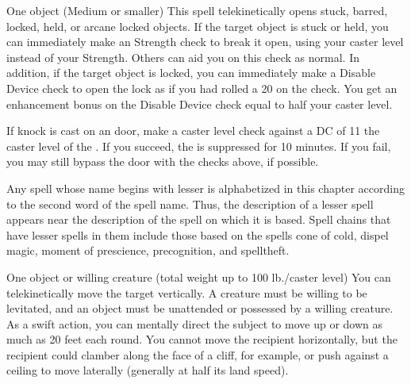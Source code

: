 \begin{comment}
\subsubsection{J-L}
\end{comment}

\spellrng{\rngclose}
\begin{spelltarget}{One object (Medium or smaller)}
    \spelleffect This spell telekinetically opens stuck, barred, locked, held, or arcane locked objects. If the target object is stuck or held, you can immediately make an Strength check to break it open, using your caster level instead of your Strength. Others can aid you on this check as normal. In addition, if the target object is locked, you can immediately make a Disable Device check to open the lock as if you had rolled a 20 on the check. You get an enhancement bonus on the Disable Device check equal to half your caster level.
\end{spelltarget}
\spellnotes If knock is cast on an  door, make a caster level check against a DC of 11 \add the caster level of the . If you succeed, the  is suppressed for 10 minutes. If you fail, you may still bypass the door with the checks above, if possible.

\par Any spell whose name begins with lesser is alphabetized in this chapter according to the second word of the spell name. Thus, the description of a lesser spell appears near the description of the spell on which it is based. Spell chains that have lesser spells in them include those based on the spells cone of cold, dispel magic, moment of prescience, precognition, and spelltheft.

\spellrng{\rngclose}
\spelldur{\durshort \dismissable}
\begin{spelltarget}{One object or willing creature (total weight up to 100 lb./caster level)}
    \spelleffect You can telekinetically move the target vertically. A creature must be willing to be levitated, and an object must be unattended or possessed by a willing creature. As a swift action, you can mentally direct the subject to move up or down as much as 20 feet each round. You cannot move the recipient horizontally, but the recipient could clamber along the face of a cliff, for example, or push against a ceiling to move laterally (generally at half its land speed).
\end{spelltarget}

